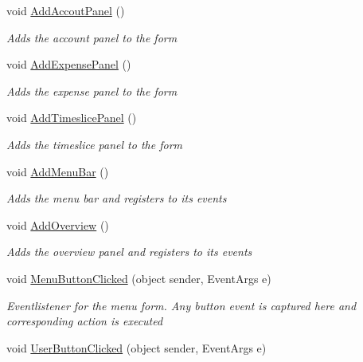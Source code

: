 \begin{DoxyCompactItemize}
void \hyperlink{class_plex_byte_1_1_mo_cap_1_1_win_forms_1_1_u_i_manager_a0bd20495a17dbb92282d2b05d3f6b93e}{Add\+Accout\+Panel} ()
\begin{DoxyCompactList}\small\item\em Adds the account panel to the form \end{DoxyCompactList}\item 
void \hyperlink{class_plex_byte_1_1_mo_cap_1_1_win_forms_1_1_u_i_manager_a40872f9b160e94b5f8581327333613a6}{Add\+Expense\+Panel} ()
\begin{DoxyCompactList}\small\item\em Adds the expense panel to the form \end{DoxyCompactList}\item 
void \hyperlink{class_plex_byte_1_1_mo_cap_1_1_win_forms_1_1_u_i_manager_a0a5787d6a1ad89c94285b6e76e1620fa}{Add\+Timeslice\+Panel} ()
\begin{DoxyCompactList}\small\item\em Adds the timeslice panel to the form \end{DoxyCompactList}\item 
void \hyperlink{class_plex_byte_1_1_mo_cap_1_1_win_forms_1_1_u_i_manager_abfcc84fe9310107439ddc6246c17cfc5}{Add\+Menu\+Bar} ()
\begin{DoxyCompactList}\small\item\em Adds the menu bar and registers to its events \end{DoxyCompactList}\item 
void \hyperlink{class_plex_byte_1_1_mo_cap_1_1_win_forms_1_1_u_i_manager_a6ecb1b3bc45f136e9e27082ebbef50ff}{Add\+Overview} ()
\begin{DoxyCompactList}\small\item\em Adds the overview panel and registers to its events \end{DoxyCompactList}\item 
void \hyperlink{class_plex_byte_1_1_mo_cap_1_1_win_forms_1_1_u_i_manager_acc6cd7bda0068ef95972294ed4f70719}{Menu\+Button\+Clicked} (object sender, Event\+Args e)
\begin{DoxyCompactList}\small\item\em Eventlistener for the menu form. Any button event is captured here and corresponding action is executed \end{DoxyCompactList}\item 
void \hyperlink{class_plex_byte_1_1_mo_cap_1_1_win_forms_1_1_u_i_manager_a89ef5c659353bd8488e286602552629e}{User\+Button\+Clicked} (object sender, Event\+Args e)

\end{DoxyCompactItemize}
